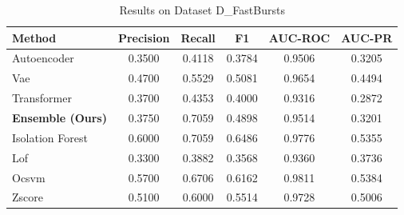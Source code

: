 \begin{table}[htbp]
\caption{Results on Dataset D_FastBursts}
\begin{center}
\begin{tabular}{|l|c|c|c|c|c|}
\hline
\textbf{Method} & \textbf{Precision} & \textbf{Recall} & \textbf{F1} & \textbf{AUC-ROC} & \textbf{AUC-PR} \\
\hline
Autoencoder & 0.3500 & 0.4118 & 0.3784 & 0.9506 & 0.3205 \\
Vae & 0.4700 & 0.5529 & 0.5081 & 0.9654 & 0.4494 \\
Transformer & 0.3700 & 0.4353 & 0.4000 & 0.9316 & 0.2872 \\
\hline
\textbf{Ensemble (Ours)} & 0.3750 & 0.7059 & 0.4898 & 0.9514 & 0.3201 \\
Isolation Forest & 0.6000 & 0.7059 & 0.6486 & 0.9776 & 0.5355 \\
Lof & 0.3300 & 0.3882 & 0.3568 & 0.9360 & 0.3736 \\
Ocsvm & 0.5700 & 0.6706 & 0.6162 & 0.9811 & 0.5384 \\
Zscore & 0.5100 & 0.6000 & 0.5514 & 0.9728 & 0.5006 \\
\hline
\hline
\end{tabular}
\label{tab:results_d_fastbursts}
\end{center}
\end{table}